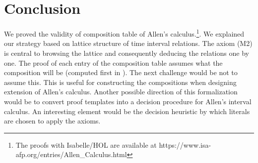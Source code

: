 \documentclass{llncs}
\begin{document}
\section{Conclusion}
\label{sect:conc}
We proved the validity of composition table of Allen's calculus.\footnote{The proofs with Isabelle/HOL are available at {https://www.isa-afp.org/entries/Allen\_Calculus.html}}. We explained our strategy based on lattice structure of time interval relations. The axiom (M2) is central to browsing the lattice and consequently deducing the relations one by one. The proof of each entry of the composition table assumes what the composition will be (computed first  in \cite{Allen:1983}). The next challenge would be not to assume this. This is useful for constructing the compositions when designing extension of Allen's calculus.  
Another possible direction of this formalization would be to convert proof templates into a decision procedure for Allen's interval calculus. An interesting element would be the decision heuristic by which literals are chosen to apply the axioms.




\label{sect:bib}

%
%
%

\end{document}
